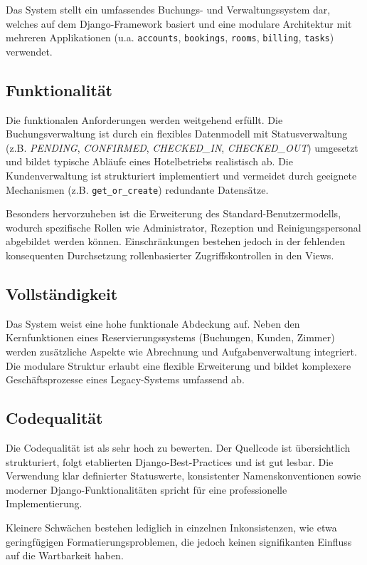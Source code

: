 Das System stellt ein umfassendes Buchungs- und Verwaltungssystem dar, welches auf dem Django-Framework basiert und eine modulare Architektur mit mehreren Applikationen (u.a. \texttt{accounts}, \texttt{bookings}, \texttt{rooms}, \texttt{billing}, \texttt{tasks}) verwendet.

\subsection{Funktionalität}

Die funktionalen Anforderungen werden weitgehend erfüllt. Die Buchungsverwaltung ist durch ein flexibles Datenmodell mit Statusverwaltung (z.B. \textit{PENDING}, \textit{CONFIRMED}, \textit{CHECKED\_IN}, \textit{CHECKED\_OUT}) umgesetzt und bildet typische Abläufe eines Hotelbetriebs realistisch ab. Die Kundenverwaltung ist strukturiert implementiert und vermeidet durch geeignete Mechanismen (z.B. \texttt{get\_or\_create}) redundante Datensätze.

Besonders hervorzuheben ist die Erweiterung des Standard-Benutzermodells, wodurch spezifische Rollen wie Administrator, Rezeption und Reinigungspersonal abgebildet werden können. Einschränkungen bestehen jedoch in der fehlenden konsequenten Durchsetzung rollenbasierter Zugriffskontrollen in den Views.

\subsection{Vollständigkeit}

Das System weist eine hohe funktionale Abdeckung auf. Neben den Kernfunktionen eines Reservierungssystems (Buchungen, Kunden, Zimmer) werden zusätzliche Aspekte wie Abrechnung und Aufgabenverwaltung integriert. Die modulare Struktur erlaubt eine flexible Erweiterung und bildet komplexere Geschäftsprozesse eines Legacy-Systems umfassend ab.

\subsection{Codequalität}

Die Codequalität ist als sehr hoch zu bewerten. Der Quellcode ist übersichtlich strukturiert, folgt etablierten Django-Best-Practices und ist gut lesbar. Die Verwendung klar definierter Statuswerte, konsistenter Namenskonventionen sowie moderner Django-Funktionalitäten spricht für eine professionelle Implementierung.

Kleinere Schwächen bestehen lediglich in einzelnen Inkonsistenzen, wie etwa geringfügigen Formatierungsproblemen, die jedoch keinen signifikanten Einfluss auf die Wartbarkeit haben.


